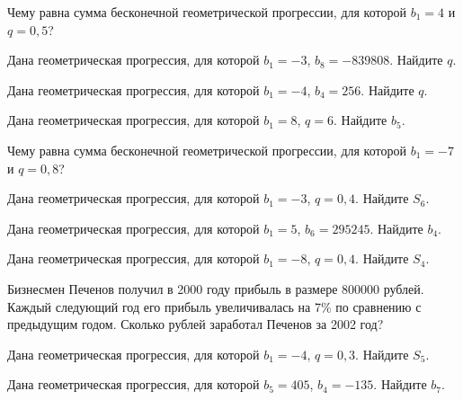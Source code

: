 \documentclass[4apaper]{article}
\begin{document}
\begin{taskBN}{19}
Чему равна сумма бесконечной геометрической прогрессии, для которой $b_1 = 4$ и $q=0,5$?
\end{taskBN}

\begin{taskBN}{20}
Дана геометрическая прогрессия, для которой $b_1 = -3$, $b_{8}=-839808$. Найдите $q$.
\end{taskBN}

\begin{taskBN}{21}
Дана геометрическая прогрессия, для которой $b_1 = -4$, $b_{4}=256$. Найдите $q$.
\end{taskBN}

\begin{taskBN}{22}
Дана геометрическая прогрессия, для которой $b_1 = 8$, $q=6$. Найдите $b_{5}$.
\end{taskBN}

\begin{taskBN}{23}
Чему равна сумма бесконечной геометрической прогрессии, для которой $b_1 = -7$ и $q=0,8$?
\end{taskBN}

\begin{taskBN}{24}
Дана геометрическая прогрессия, для которой $b_1 = -3$, $q=0,4$. Найдите $S_{6}$.
\end{taskBN}

\begin{taskBN}{25}
Дана геометрическая прогрессия, для которой $b_1 = 5$, $b_{6}=295245$. Найдите $b_{4}$.
\end{taskBN}

\begin{taskBN}{26}
Дана геометрическая прогрессия, для которой $b_1 = -8$, $q=0,4$. Найдите $S_{4}$.
\end{taskBN}

\begin{taskBN}{27}
Бизнесмен Печенов получил в 2000 году прибыль в размере 800000 рублей. Каждый следующий год его прибыль увеличивалась на 7\% по сравнению с предыдущим годом. Сколько рублей заработал Печенов за 2002 год?
\end{taskBN}

\begin{taskBN}{28}
Дана геометрическая прогрессия, для которой $b_1 = -4$, $q=0,3$. Найдите $S_{5}$.
\end{taskBN}

\begin{taskBN}{29}
Дана геометрическая прогрессия, для которой $b_{5} = 405$, $b_{4}=-135$. Найдите $b_{7}$.
\end{taskBN}
\end{document}
